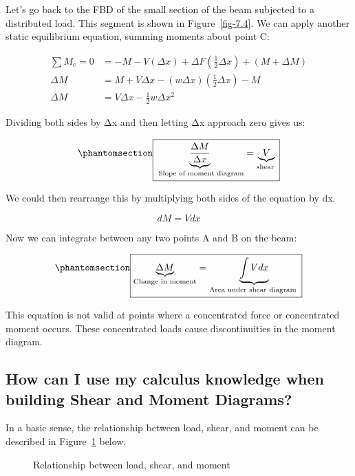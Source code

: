 \documentclass[
  letterpaper,
  DIV=11,
  numbers=noendperiod]{scrreprt}
\theoremstyle{definition}
\theoremstyle{remark}
\begin{document}
Let's go back to the FBD of the small section of the beam subjected to a
distributed load. This segment is shown in Figure~\ref{fig-7.4}. We can
apply another static equilibrium equation, summing moments about point
C:

\[
\begin{aligned}
\sum M_c=0 & =-M-V(\Delta x)+\Delta F\left(\frac{1}{2} \Delta x\right)+(M+\Delta M) \\
\Delta M & =M+V \Delta x-(w \Delta x)\left(\frac{1}{2} \Delta x\right)-M \\
\Delta M & =V \Delta x-\frac{1}{2} w \Delta x^2
\end{aligned}
\]

Dividing both sides by Δx and then letting Δx approach zero gives us:

\begin{equation}\phantomsection\label{eq-7.3}{
\boxed{\underbrace{\frac{\Delta M}{\Delta x}}_{\text { Slope of moment diagram}}=\underbrace{V}_{\text {shear }}}
}\end{equation}

We could then rearrange this by multiplying both sides of the equation
by dx.

\[
d M=V d x
\]

Now we can integrate between any two points A and B on the beam:

\begin{equation}\phantomsection\label{eq-7.4}{
\boxed{\underbrace{\Delta M}_{\text {Change in moment}}=\underbrace{\int V d x}_{\text {Area under shear diagram }}}
}\end{equation}

This equation is not valid at points where a concentrated force or
concentrated moment occurs. These concentrated loads cause
discontinuities in the moment diagram.

\subsection{How can I use my calculus knowledge when building Shear and
Moment
Diagrams?}\label{how-can-i-use-my-calculus-knowledge-when-building-shear-and-moment-diagrams}

In a basic sense, the relationship between load, shear, and moment can
be described in Figure~\ref{fig-7.5} below.

\begin{figure}


\caption{\label{fig-7.5}Relationship between load, shear, and moment}

\end{figure}%
\end{document}
